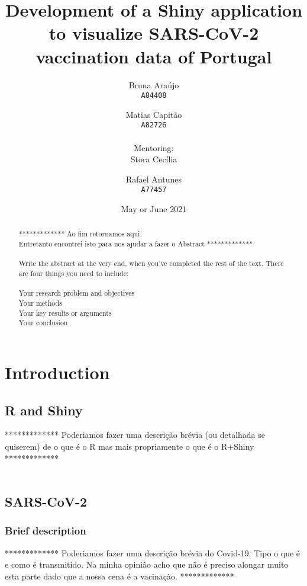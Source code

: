 \documentclass[11pt,a4paper]{report}
\title{Development of a Shiny application to visualize SARS-CoV-2 vaccination data of Portugal}
\author{
  Bruna Araújo\\
  \texttt{A84408}
  \and
  Matias Capitão\\
  \texttt{A82726} \\ 
  \\ Mentoring:\\
  Stora Cecília \\
  \and
  Rafael Antunes\\
  \texttt{A77457}
}
\date{May or June 2021}
\begin{document}
\maketitle

\begin{abstract}
    ************* Ao fim retornamos aqui.\\ Entretanto encontrei isto para nos ajudar a fazer o Abstract *************\\ \\
    Write the abstract at the very end, when you’ve completed the rest of the text. There are four things you need to include:\\ \\

    Your research problem and objectives\\
    Your methods\\
    Your key results or arguments\\
    Your conclusion

\end{abstract}

\tableofcontents
\newpage

\listoffigures
\newpage

\listoftables
\newpage


\chapter{Introduction}
\section{R and Shiny}
    ************* Poderiamos fazer uma descrição brévia (ou detalhada se quiserem) de o que é o R mas mais propriamente o que é o R+Shiny *************\\ \\

\section{SARS-CoV-2}
\subsection{Brief description}
    ************* Poderiamos fazer uma descrição brévia do Covid-19. Tipo o que é e como é transmitido. Na minha opinião acho que não é preciso alongar muito esta parte dado que a nossa cena é a vacinação.   *************\\ \\
\end{document}
